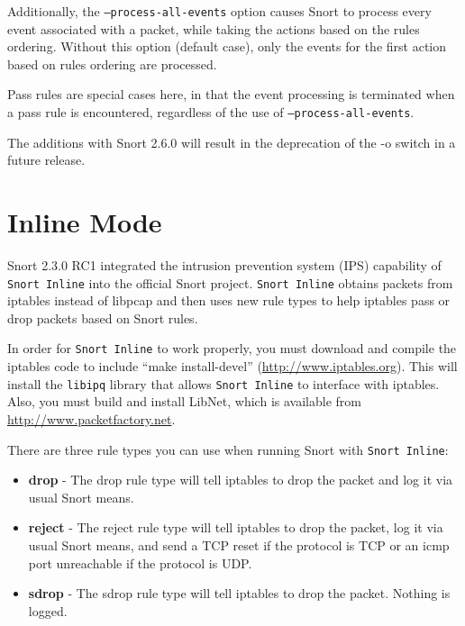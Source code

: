 \documentclass[english]{report}
\newenvironment{note}{
\samepage
    \vspace{10pt}{\textsf{
        {\hspace{7pt}\Huge{$\triangle$\hspace{-12.5pt}{\Large{$^!$}}}}\hspace{5pt}
        {\Large{NOTE}}
    }
    }
   \begin{center}
    \par\vspace{-17pt}

    \begin{lrbox}{\savepar}
    \begin{minipage}[r]{6in}
}
{
    \end{minipage}
    \end{lrbox}
    \fbox{
        \usebox{
            \savepar
	}
    }
    \par\vskip10pt
    \end{center}
}
\newenvironment{note}{
        \begin{rawhtml}
        <p><table border="1"><tr><td><b>
        Note:&nbsp;&nbsp;</b>
        \end{rawhtml}
}{
        \begin{rawhtml}
        </b></td></tr></table></p>
        \end{rawhtml}
}
\begin{document}
Additionally, the \texttt{--process-all-events} option causes Snort to
process every event associated with a packet, while taking the actions
based on the rules ordering.  Without this option (default case), only
the events for the first action based on rules ordering are processed.

\begin{note}
Pass rules are special cases here, in that the event processing is
terminated when a pass rule is encountered, regardless of the use of
\texttt{--process-all-events}.
\end{note}

\begin{note}
The additions with Snort 2.6.0 will result in the deprecation of the
-o switch in a future release.
\end{note}

\section{Inline Mode\label{Snort Inline}}

Snort 2.3.0 RC1 integrated the intrusion prevention system (IPS) capability of
\texttt{Snort Inline} into the official Snort project. \texttt{Snort Inline} obtains packets
from iptables instead of libpcap and then uses new rule types to help iptables
pass or drop packets based on Snort rules.  

In order for \texttt{Snort Inline} to work properly, you must download and compile the
iptables code to include ``make install-devel''
(\url{http://www.iptables.org}).  This will install the \texttt{libipq} library
that allows \texttt{Snort Inline} to interface with iptables.  Also, you must build and
install LibNet, which is available from \url{http://www.packetfactory.net}.

There are three rule types you can use when running Snort with \texttt{Snort Inline}:

\begin{itemize}
\item \textbf{drop} - The drop rule type will tell iptables to drop the packet and log it 
       via usual Snort means.
\item \textbf{reject} - The reject rule type will tell iptables to drop the packet, log it 
         via usual Snort means, and send a TCP reset if the protocol is 
         TCP or an icmp port unreachable if the protocol is UDP.
\item \textbf{sdrop} - The sdrop rule type will tell iptables to drop the packet.  Nothing
        is logged.
\end{itemize}
\end{document}
